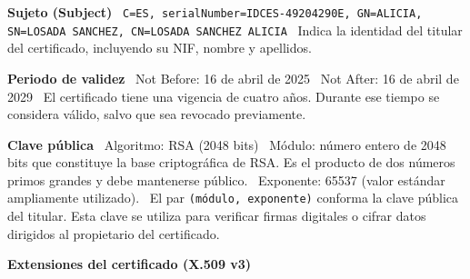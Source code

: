 \textbf{Sujeto (Subject)} \ \texttt{C=ES, serialNumber=IDCES-49204290E, GN=ALICIA, \\SN=LOSADA SANCHEZ, CN=LOSADA SANCHEZ ALICIA} \ Indica la identidad del titular del certificado, incluyendo su NIF, nombre y apellidos.

\textbf{Periodo de validez} \ Not Before: 16 de abril de 2025 \ Not After: 16 de abril de 2029 \ El certificado tiene una vigencia de cuatro años. Durante ese tiempo se considera válido, salvo que sea revocado previamente.

\textbf{Clave pública} \ Algoritmo: RSA (2048 bits) \ Módulo: número entero de 2048 bits que constituye la base criptográfica de RSA. Es el producto de dos números primos grandes y debe mantenerse público. \ Exponente: 65537 (valor estándar ampliamente utilizado). \ El par \texttt{(módulo, exponente)} conforma la clave pública del titular. Esta clave se utiliza para verificar firmas digitales o cifrar datos dirigidos al propietario del certificado.

\textbf{Extensiones del certificado (X.509 v3)}

